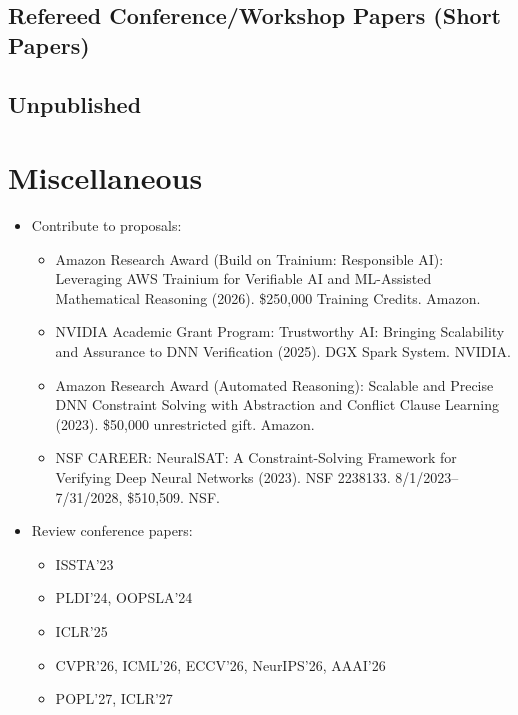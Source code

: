 \documentclass[11pt]{article}
\begin{document}
\subsection{Refereed Conference/Workshop Papers (Short Papers)}
    \begin{enumerate}[label=S\arabic*]
    \end{enumerate}

\subsection{Unpublished}

    \begin{enumerate}[label=U\arabic*]
    \end{enumerate}


\section{Miscellaneous}

    \begin{itemize}
        \item Contribute to proposals: 
        \begin{itemize}
            \item Amazon Research Award (Build on Trainium: Responsible AI): Leveraging AWS Trainium for Verifiable AI and ML-Assisted Mathematical Reasoning (2026). \$250,000 Training Credits. Amazon.
            \item NVIDIA Academic Grant Program: Trustworthy AI: Bringing Scalability and Assurance to DNN Verification (2025). DGX Spark System. NVIDIA.
            \item Amazon Research Award (Automated Reasoning): Scalable and Precise DNN Constraint Solving with Abstraction and Conflict Clause Learning (2023). \$50,000 unrestricted gift. Amazon.
            \item NSF CAREER: NeuralSAT: A Constraint-Solving Framework for Verifying Deep Neural Networks (2023). NSF 2238133. 8/1/2023–7/31/2028, \$510,509. NSF.
        \end{itemize}
        \item Review conference papers:
        \begin{itemize}
            \item ISSTA'23
            \item PLDI'24, OOPSLA'24
            \item ICLR'25
            \item CVPR'26, ICML'26, ECCV'26, NeurIPS'26, AAAI'26
            \item POPL'27, ICLR'27
        \end{itemize}
    \end{itemize}

\updateinfo{}
\end{document}
